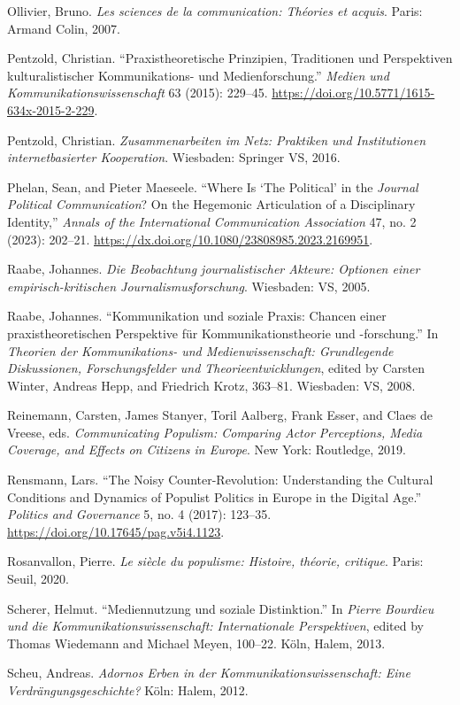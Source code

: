 \documentclass{tufte-handout}
\begin{document}
\begin{hangparas}{.25in}{1}
Ollivier, Bruno. \emph{Les sciences de la communication: Théories et
acquis}. Paris: Armand Colin, 2007.

Pentzold, Christian. ``Praxistheoretische Prinzipien, Traditionen und
Perspektiven kulturalistischer Kommunikations- und Medienforschung.''
\emph{Medien und Kommunikationswissenschaft} 63 (2015): 229--45.
\url{https://doi.org/10.5771/1615-634x-2015-2-229}.

Pentzold, Christian. \emph{Zusammenarbeiten im Netz: Praktiken und
Institutionen internetbasierter Kooperation}. Wiesbaden: Springer VS,
2016.

Phelan, Sean, and Pieter Maeseele. ``Where Is `The Political' in the
\emph{Journal Political Communication}? On the Hegemonic Articulation of
a Disciplinary Identity,'' \emph{Annals of the International
Communication Association} 47, no. 2 (2023): 202--21.
\url{https://dx.doi.org/10.1080/23808985.2023.2169951}.

Raabe, Johannes. \emph{Die Beobachtung journalistischer Akteure:
Optionen einer empirisch-kritischen Journalismusforschung}. Wiesbaden:
VS, 2005.

Raabe, Johannes. ``Kommunikation und soziale Praxis: Chancen einer
praxistheoretischen Perspektive für Kommunikationstheorie und
-forschung.'' In \emph{Theorien der Kommunikations- und
Medienwissenschaft: Grundlegende Diskussionen, Forschungsfelder und
Theorieentwicklungen}, edited by Carsten Winter, Andreas Hepp, and
Friedrich Krotz, 363--81. Wiesbaden: VS, 2008.

Reinemann, Carsten, James Stanyer, Toril Aalberg, Frank Esser, and Claes
de Vreese, eds. \emph{Communicating Populism: Comparing Actor
Perceptions, Media Coverage, and Effects on Citizens in Europe}. New
York: Routledge, 2019.

Rensmann, Lars. ``The Noisy Counter-Revolution: Understanding the
Cultural Conditions and Dynamics of Populist Politics in Europe in the
Digital Age.'' \emph{Politics and Governance} 5, no. 4 (2017): 123--35.
\url{https://doi.org/10.17645/pag.v5i4.1123}.

Rosanvallon, Pierre. \emph{Le siècle du populisme: Histoire, théorie,
critique}. Paris: Seuil, 2020.

Scherer, Helmut. ``Mediennutzung und soziale Distinktion.'' In
\emph{Pierre Bourdieu und die Kommunikationswissenschaft: Internationale
Perspektiven}, edited by Thomas Wiedemann and Michael Meyen, 100--22.
Köln, Halem, 2013.

Scheu, Andreas. \emph{Adornos Erben in der Kommunikationswissenschaft:
Eine Verdrängungsgeschichte?} Köln: Halem, 2012.


\end{hangparas}
\end{document}
